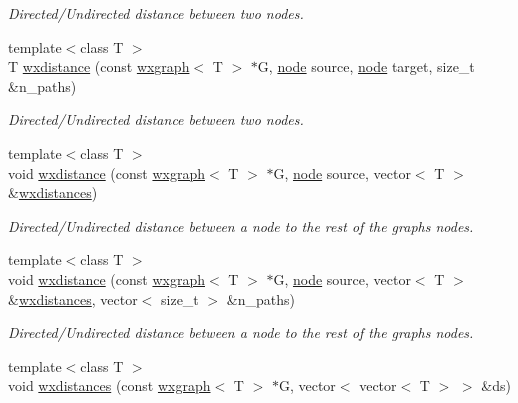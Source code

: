 \begin{DoxyCompactItemize}
\begin{DoxyCompactList}\small\item\em Directed/\+Undirected distance between two nodes. \end{DoxyCompactList}\item 
{\footnotesize template$<$class T $>$ }\\T \hyperlink{namespacelgraph_1_1traversal_a39a6c5e2fa275d28c02051dbbd934e39}{wxdistance} (const \hyperlink{classlgraph_1_1utils_1_1wxgraph}{wxgraph}$<$ T $>$ $\ast$G, \hyperlink{namespacelgraph_1_1utils_ab9c6b34241f0b68372c55f34c460e863}{node} source, \hyperlink{namespacelgraph_1_1utils_ab9c6b34241f0b68372c55f34c460e863}{node} target, size\+\_\+t \&n\+\_\+paths)
\begin{DoxyCompactList}\small\item\em Directed/\+Undirected distance between two nodes. \end{DoxyCompactList}\item 
{\footnotesize template$<$class T $>$ }\\void \hyperlink{namespacelgraph_1_1traversal_a386f294701634911e0c62fdbacb4a976}{wxdistance} (const \hyperlink{classlgraph_1_1utils_1_1wxgraph}{wxgraph}$<$ T $>$ $\ast$G, \hyperlink{namespacelgraph_1_1utils_ab9c6b34241f0b68372c55f34c460e863}{node} source, vector$<$ T $>$ \&\hyperlink{namespacelgraph_1_1traversal_a4d673389e0b2135edfb4fbf0e8dec386}{wxdistances})
\begin{DoxyCompactList}\small\item\em Directed/\+Undirected distance between a node to the rest of the graph\textquotesingle{}s nodes. \end{DoxyCompactList}\item 
{\footnotesize template$<$class T $>$ }\\void \hyperlink{namespacelgraph_1_1traversal_a7a1170b8673e281f64d4987c6986e41f}{wxdistance} (const \hyperlink{classlgraph_1_1utils_1_1wxgraph}{wxgraph}$<$ T $>$ $\ast$G, \hyperlink{namespacelgraph_1_1utils_ab9c6b34241f0b68372c55f34c460e863}{node} source, vector$<$ T $>$ \&\hyperlink{namespacelgraph_1_1traversal_a4d673389e0b2135edfb4fbf0e8dec386}{wxdistances}, vector$<$ size\+\_\+t $>$ \&n\+\_\+paths)
\begin{DoxyCompactList}\small\item\em Directed/\+Undirected distance between a node to the rest of the graph\textquotesingle{}s nodes. \end{DoxyCompactList}\item 
{\footnotesize template$<$class T $>$ }\\void \hyperlink{namespacelgraph_1_1traversal_a4d673389e0b2135edfb4fbf0e8dec386}{wxdistances} (const \hyperlink{classlgraph_1_1utils_1_1wxgraph}{wxgraph}$<$ T $>$ $\ast$G, vector$<$ vector$<$ T $>$ $>$ \&ds)

\end{DoxyCompactItemize}
